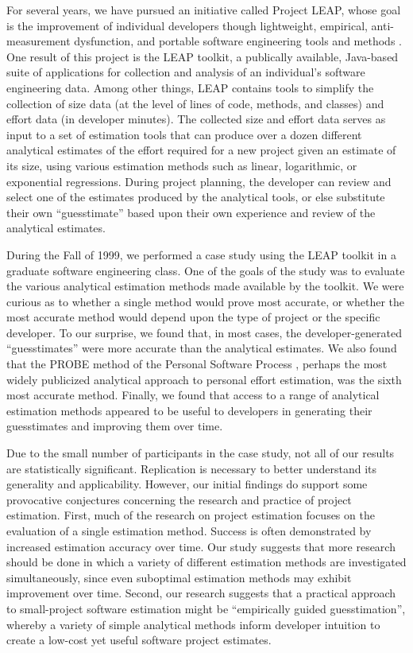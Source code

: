 For several years, we have pursued an initiative called Project LEAP, whose
goal is the improvement of individual developers though lightweight,
empirical, anti-measurement dysfunction, and portable software engineering
tools and methods \cite{csdl2-00-01}.  One result of this project is the
LEAP toolkit, a publically available, Java-based suite of applications for
collection and analysis of an individual's software engineering data.
Among other things, LEAP contains tools to simplify the collection of size
data (at the level of lines of code, methods, and classes) and effort data
(in developer minutes). The collected size and effort data serves as input
to a set of estimation tools that can produce over a dozen different
analytical estimates of the effort required for a new project given an
estimate of its size, using various estimation methods such as linear,
logarithmic, or exponential regressions.  During project planning, the
developer can review and select one of the estimates produced by the
analytical tools, or else substitute their own ``guesstimate'' based upon
their own experience and review of the analytical estimates.

During the Fall of 1999, we performed a case study using the LEAP toolkit
in a graduate software engineering class.  One of the goals of the study
was to evaluate the various analytical estimation methods made available by
the toolkit.  We were curious as to whether a single method would prove
most accurate, or whether the most accurate method would depend upon the
type of project or the specific developer.  To our surprise, we found that,
in most cases, the developer-generated ``guesstimates'' were more accurate
than the analytical estimates.  We also found that the PROBE method of the
Personal Software Process \cite{Humphrey95}, perhaps the most widely
publicized analytical approach to personal effort estimation, was the sixth
most accurate method.  Finally, we found that access to a range of
analytical estimation methods appeared to be useful to developers in
generating their guesstimates and improving them over time. 

Due to the small number of participants in the case study, not all of our
results are statistically significant.  Replication is necessary 
to better understand its generality and applicability.  However, our
initial findings do support some provocative conjectures concerning the
research and practice of project estimation. First, much of the research on
project estimation focuses on the evaluation of a single estimation
method.  Success is often demonstrated by increased estimation accuracy
over time. Our study suggests that more research should be done in which a
variety of different estimation methods are investigated
simultaneously, since even suboptimal estimation methods may exhibit
improvement over time.  Second, our research suggests that a practical
approach to small-project software estimation might be ``empirically guided
guesstimation'', whereby a variety of simple analytical methods inform
developer intuition to create a low-cost yet useful software project
estimates.

